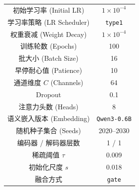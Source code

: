 \begin{table}[!htb]
\begin{tabular}{c|c}
初始学习率 (Initial LR) & $1 \times 10^{-4}$ \\
学习率策略 (LR Scheduler) & \texttt{type1} \\
权重衰减 (Weight Decay) & $1 \times 10^{-4}$ \\
训练轮数 (Epochs) & 100 \\
批大小 (Batch Size) & 16 \\
早停耐心值 (Patience) & 10 \\
通道维度 $C$ (Channels) & 64 \\
Dropout & 0.1 \\
注意力头数 (Heads) & 8 \\
语义嵌入版本 (Embedding) & \texttt{Qwen3-0.6B} \\
随机种子集合 (Seeds) & 2020--2030 \\
\midrule
编码器 / 解码器层数 & 1 / 1 \\
稀疏阈值 $\tau$ & 0.009 \\
初始化尺度 $s$ & 0.018 \\
融合方式 & \texttt{gate} \\
\bottomrule
\end{tabular}

\end{table}

